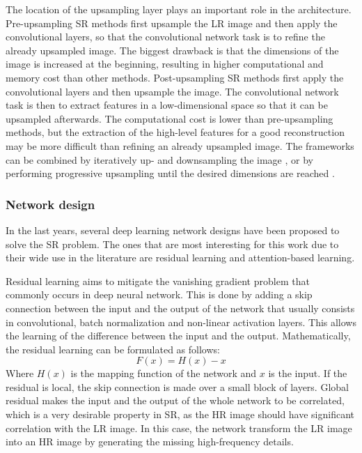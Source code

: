         The location of the upsampling layer plays an important role in the architecture. Pre-upsampling SR methods first upsample the LR image and then apply the convolutional layers, so that the convolutional network task is to refine the already upsampled image. The biggest drawback is that the dimensions of the image is increased at the beginning, resulting in higher computational and memory cost than other methods.
        Post-upsampling SR methods first apply the convolutional layers and then upsample the image. The convolutional network task is then to extract features in a low-dimensional space so that it can be upsampled afterwards. The computational cost is lower than pre-upsampling methods, but the extraction of the high-level features for a good reconstruction may be more difficult than refining an already upsampled image. 
        The frameworks can be combined by iteratively up- and downsampling the image \cite{timofte2015seven}, or by performing progressive upsampling until the desired dimensions are reached \cite{lai2017deep}.

        \subsubsection{Network design}

        In the last years, several deep learning network designs have been proposed to solve the SR problem.  The ones that are most interesting for this work due to their wide use in the literature are residual learning and attention-based learning. 
        
        Residual learning aims to mitigate the vanishing gradient problem that commonly occurs in deep neural network. This is done by adding a skip connection between the input and the output of the network that usually consists in convolutional, batch normalization and non-linear activation layers. This allows the learning of the difference between the input and the output. Mathematically, the residual learning can be formulated as follows:
        \begin{equation}
            F(x) = H(x) - x
            \label{eq:2-residual-learning}
        \end{equation}
        Where $H(x)$ is the mapping function of the network and $x$ is the input. If the residual is local, the skip connection is made over a small block of layers. Global residual makes the input and the output of the whole network to be correlated, which is a very desirable property in SR, as the HR image should have significant correlation with the LR image. In this case, the network transform the LR image into an HR image by generating the missing high-frequency details. 
        

